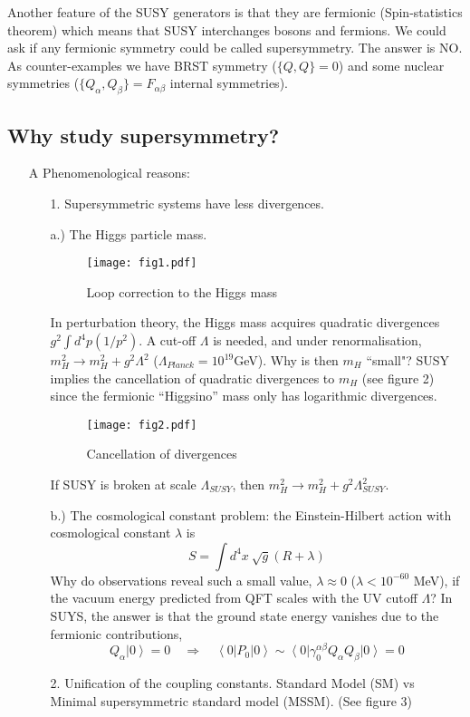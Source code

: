 \documentclass[a4paper,12pt]{article}
\numberwithin{equation}{section}
\numberwithin{exe}{section}
\renewcommand{\a}{{\alpha}}
\renewcommand{\b}{{\beta}}
\renewcommand{\l}{{\lambda}}
\renewcommand{\L}{{\Lambda}}
\begin{document}
Another feature of the SUSY generators is that they are fermionic (Spin-statistics theorem) which means that SUSY interchanges bosons and fermions. We could ask if any fermionic symmetry could be called supersymmetry. The answer is NO. As counter-examples we have BRST symmetry ($\{Q,Q\}= 0$) and some nuclear symmetries ($\{Q_\a, Q_\b\}= F_{\a\b}$ internal symmetries).

\subsection{Why study supersymmetry?}

	\begin{enumerate}
	\item[A] Phenomenological reasons:
		\begin{enumerate}
		\item[1.] Supersymmetric systems have less divergences.
		
		a.) The Higgs particle mass.
			\begin{figure}[h]
			\centering
			\texttt{[image: fig1.pdf]}
			\caption{Loop correction to the Higgs mass}
			\end{figure}
		
		In perturbation theory, the Higgs mass acquires quadratic divergences $g^2 \int d^4p(1/p^2)$. A cut-off $\L$ is needed, and under renormalisation, $m^2_H\rightarrow m^2_H + g^2\L^2$ ($\L_{Planck} = 10^{19}$GeV). Why is then $m_H$  ``small"? SUSY implies the cancellation of quadratic divergences to $m_H$ (see figure 2) since the fermionic ``Higgsino'' mass only has logarithmic divergences. 
			\begin{figure}[ht]
			\centering
			\texttt{[image: fig2.pdf]}
			\caption{Cancellation of divergences}
			\end{figure}

		If SUSY is broken at scale $\L_{SUSY}$, then $m^2_H\rightarrow m^2_H + g^2 \L^2_{SUSY}$.
		
		b.) The cosmological constant problem: the Einstein-Hilbert action with cosmological constant $\lambda$ is 
		$$ S = \int d^4x\ \sqrt{g}(R + \l)$$
		Why do observations reveal such a small value, $\l\approx 0$ ($\l<10^{-60}$ MeV), if the vacuum energy predicted from QFT scales with the UV cutoff $\Lambda$? In SUYS, 			the answer is that the ground state energy vanishes due to the fermionic contributions,
		$$Q_\a\left|0\right>=0\quad\Rightarrow\quad\left<0\right|P_0\left|0\right> \sim \left<0\right| \gamma_0^{\a\b}Q_\a Q_\b \left|0\right>=0$$
		\item[2.] Unification of the coupling constants. Standard Model (SM) vs  Minimal supersymmetric standard model (MSSM). (See figure 3)
		

\end{enumerate}
\end{enumerate}
\end{document}
